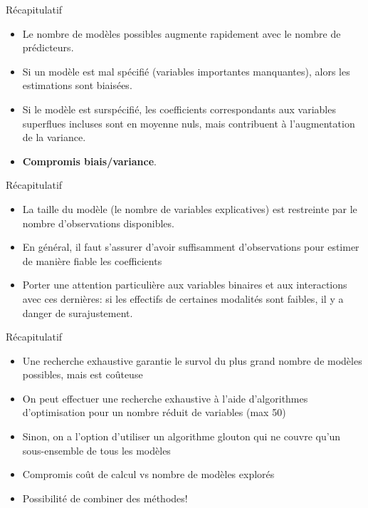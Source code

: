 \documentclass[
  ignorenonframetext,
]{beamer}
\providecommand{\tightlist}{%
  \setlength{\itemsep}{0pt}\setlength{\parskip}{0pt}}\usepackage{longtable,booktabs,array}
\begin{document}
\begin{frame}{Récapitulatif}
\protect\hypertarget{ruxe9capitulatif}{}
\begin{itemize}
\tightlist
\item
  Le nombre de modèles possibles augmente rapidement avec le nombre de
  prédicteurs.
\item
  Si un modèle est mal spécifié (variables importantes manquantes),
  alors les estimations sont biaisées.
\item
  Si le modèle est surspécifié, les coefficients correspondants aux
  variables superflues incluses sont en moyenne nuls, mais contribuent à
  l'augmentation de la variance.
\item
  \textbf{Compromis biais/variance}.
\end{itemize}
\end{frame}

\begin{frame}{Récapitulatif}
\protect\hypertarget{ruxe9capitulatif-1}{}
\begin{itemize}
\tightlist
\item
  La taille du modèle (le nombre de variables explicatives) est
  restreinte par le nombre d'observations disponibles.
\item
  En général, il faut s'assurer d'avoir suffisamment d'observations pour
  estimer de manière fiable les coefficients
\item
  Porter une attention particulière aux variables binaires et aux
  interactions avec ces dernières: si les effectifs de certaines
  modalités sont faibles, il y a danger de surajustement.
\end{itemize}
\end{frame}

\begin{frame}{Récapitulatif}
\protect\hypertarget{ruxe9capitulatif-2}{}
\begin{itemize}
\tightlist
\item
  Une recherche exhaustive garantie le survol du plus grand nombre de
  modèles possibles, mais est coûteuse
\item
  On peut effectuer une recherche exhaustive à l'aide d'algorithmes
  d'optimisation pour un nombre réduit de variables (max 50)
\item
  Sinon, on a l'option d'utiliser un algorithme glouton qui ne couvre
  qu'un sous-ensemble de tous les modèles
\item
  Compromis coût de calcul vs nombre de modèles explorés
\item
  Possibilité de combiner des méthodes!
\end{itemize}
\end{frame}
\end{document}
